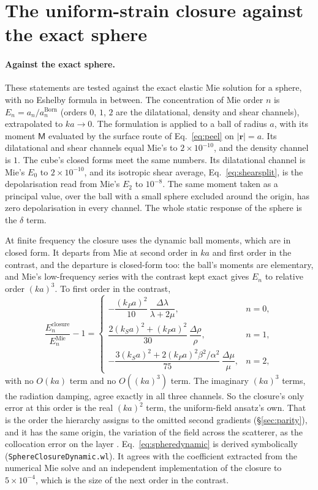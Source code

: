 \documentclass[11pt,a4paper]{article}
\newcommand{\nb}[1]{\texttt{#1}}
\begin{document}
\FloatBarrier

\section{The uniform-strain closure against the exact sphere}\label{app:closuremie}

\paragraph{Against the exact sphere.} These statements are tested against the exact elastic Mie
solution for a sphere, with no Eshelby formula in between. The concentration of Mie order $n$ is
$E_n=a_n/a_n^{\text{Born}}$ (orders $0$, $1$, $2$ are the dilatational, density and shear
channels), extrapolated to $ka\to0$. The formulation is applied to a ball of radius $a$, with its moment
$\mathsf M$ evaluated by the surface route of Eq.~\eqref{eq:peel} on $|\mathbf r|=a$. Its
dilatational and shear channels equal Mie's to $2\times10^{-10}$, and the density channel is
$1$. The cube's closed forms meet the same numbers. Its dilatational channel is Mie's
$E_0$ to $2\times10^{-10}$, and its isotropic shear average, Eq.~\eqref{eq:shearsplit}, is the
depolarisation read from Mie's $E_2$ to $10^{-8}$. The same moment taken as a principal value, over
the ball with a small sphere excluded around the origin, has zero depolarisation in every
channel. The whole static response of the sphere is the $\delta$ term.

At finite frequency the closure uses the dynamic ball moments, which are in closed form. It
departs from Mie at second order in $ka$ and first order in the contrast, and the departure is
closed-form too: the ball's moments are elementary, and Mie's low-frequency series with the
contrast kept exact gives $E_n$ to relative order $(ka)^3$. To first order in the contrast,
\begin{equation}\label{eq:spheredynamic}
\frac{E_n^{\text{closure}}}{E_n^{\text{Mie}}}-1=
\begin{cases}
  -\dfrac{(k_Pa)^2}{10}\,\dfrac{\Delta\lambda}{\lambda+2\mu}, & n=0,\\[8pt]
  \dfrac{2(k_Sa)^2+(k_Pa)^2}{30}\,\dfrac{\Delta\rho}{\rho}, & n=1,\\[8pt]
  -\dfrac{3(k_Sa)^2+2(k_Pa)^2\beta^2/\alpha^2}{75}\,\dfrac{\Delta\mu}{\mu}, & n=2,
\end{cases}
\end{equation}
with no $O(ka)$ term and no $O((ka)^3)$ term. The imaginary $(ka)^3$ terms, the radiation damping,
agree exactly in all three channels. So the closure's only error at this order is the real
$(ka)^2$ term, the uniform-field ansatz's own. That is the order the hierarchy assigns to the
omitted second gradients (\S\ref{sec:parity}), and it has the same origin, the variation of the
field across the scatterer, as the collocation error on the layer \citep{NestorError2026}. Eq.~\eqref{eq:spheredynamic} is derived symbolically
(\nb{SphereClosureDynamic.wl}). It agrees with the coefficient extracted from the numerical Mie
solve and an independent implementation of the closure to $5\times10^{-4}$, which is the size of the
next order in the contrast.
\end{document}
